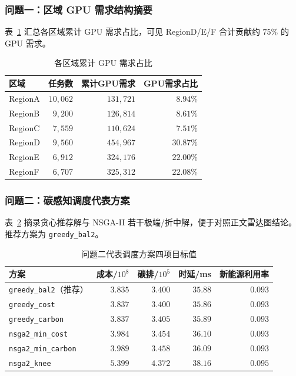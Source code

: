 \documentclass[UTF8,a4paper,zihao=-4]{ctexart}
\begin{document}
\subsubsection{问题一：区域 GPU 需求结构摘要}

表~\ref{tab:app-q1-region-share} 汇总各区域累计 GPU 需求占比，可见 RegionD/E/F 合计贡献约 $75\%$ 的 GPU 需求。

\begin{table}[H]
\centering
\small
\caption{各区域累计 GPU 需求占比}
\label{tab:app-q1-region-share}
\begin{tabular}{lrrr}
\toprule
区域 & 任务数 & 累计GPU需求 & GPU需求占比 \\
\midrule
RegionA & $10{,}062$ & $131{,}721$ & $8.94\%$ \\
RegionB & $9{,}200$ & $126{,}814$ & $8.61\%$ \\
RegionC & $7{,}559$ & $110{,}624$ & $7.51\%$ \\
RegionD & $9{,}560$ & $454{,}967$ & $30.87\%$ \\
RegionE & $6{,}912$ & $324{,}176$ & $22.00\%$ \\
RegionF & $6{,}707$ & $325{,}312$ & $22.08\%$ \\
\bottomrule
\end{tabular}
\end{table}

\subsubsection{问题二：碳感知调度代表方案}

表~\ref{tab:app-q2-summary} 摘录贪心推荐解与 NSGA-II 若干极端/折中解，便于对照正文雷达图结论。推荐方案为 \texttt{greedy\_bal2}。

\begin{table}[H]
\centering
\footnotesize
\caption{问题二代表调度方案四项目标值}
\label{tab:app-q2-summary}
\setlength{\tabcolsep}{3.5pt}
\begin{tabular}{lrrrr}
\toprule
方案 & 成本/$10^8$ & 碳排/$10^5$ & 时延/ms & 新能源利用率 \\
\midrule
\texttt{greedy\_bal2}（推荐） & $3.835$ & $3.400$ & $35.88$ & $0.093$ \\
\texttt{greedy\_cost} & $3.837$ & $3.400$ & $35.86$ & $0.093$ \\
\texttt{greedy\_carbon} & $3.837$ & $3.405$ & $35.89$ & $0.093$ \\
\texttt{nsga2\_min\_cost} & $3.984$ & $3.454$ & $36.10$ & $0.093$ \\
\texttt{nsga2\_min\_carbon} & $3.989$ & $3.458$ & $36.09$ & $0.093$ \\
\texttt{nsga2\_knee} & $5.399$ & $4.372$ & $38.16$ & $0.095$ \\
\bottomrule
\end{tabular}
\end{table}
\end{document}
